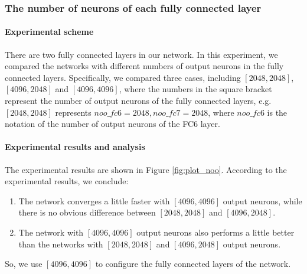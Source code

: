 \subsubsection{The number of neurons of each fully connected layer}
\paragraph{Experimental scheme}
There are two fully connected layers in our network. In this experiment, we compared the networks with different numbers of output neurons in the fully connected layers. Specifically, we compared three cases, including \([2048,2048]\), \([4096,2048]\) and \([4096,4096]\), where the numbers in the square bracket represent the number of output neurons of the fully connected layers, e.g. \([2048,2048]\) represents \(noo\_fc6 = 2048, noo\_fc7 = 2048\), where \(noo\_fc6\) is the notation of the number of output neurons of the FC6 layer.

\paragraph{Experimental results and analysis}
The experimental results are shown in Figure \ref{fig:plot_noo}. According to the experimental results, we conclude:
\begin{enumerate}
	\item The network converges a little faster with \([4096,4096]\) output neurons, while there is no obvious difference between \([2048,2048]\) and \([4096,2048]\).
	\item The network with \([4096,4096]\) output neurons also performs a little better than the networks with  \([2048,2048]\) and \([4096,2048]\) output neurons. 
\end{enumerate}
So, we  use  \([4096,4096]\) to configure the fully connected layers of the network.
 
